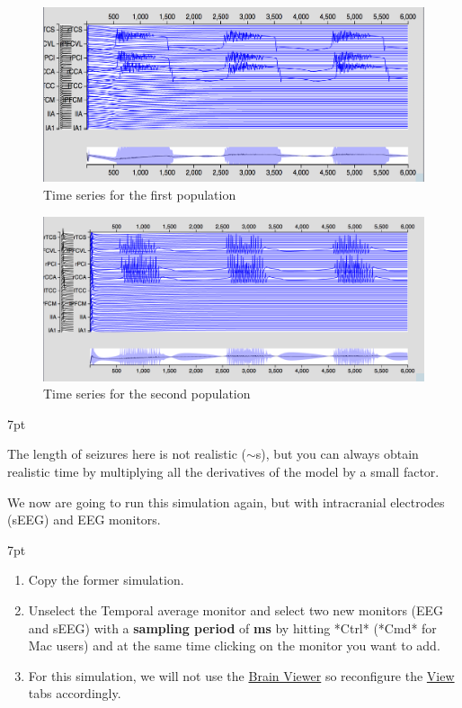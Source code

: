 \documentclass{tufte-handout}
\newenvironment{simulation}{%
  \def\FrameCommand{%
    \hspace{1pt}%
    {\color{ForestGreen}\vrule width 2pt}%
    {\color{simulationshade}\vrule width 4pt}%
    \colorbox{simulationshade}%
  }%
  \MakeFramed{\advance\hsize-\width\FrameRestore}%
  \noindent\hspace{-4.55pt}%
  \begin{adjustwidth}{}{7pt}%
  \vspace{2pt}\vspace{2pt}%
}
{%
  \vspace{2pt}\end{adjustwidth}\endMakeFramed%
}
\newenvironment{blah}{%
  \def\FrameCommand{%
    \hspace{1pt}%
    {\color{DarkOrange}\vrule width 2pt}%
    {\color{PeachPuff}\vrule width 4pt}%
    \colorbox{PeachPuff}%
  }%
  \MakeFramed{\advance\hsize-\width\FrameRestore}%
  \noindent\hspace{-4.55pt}%
  \begin{adjustwidth}{}{7pt}%
  \vspace{2pt}\vspace{2pt}%
}
{%
  \vspace{2pt}\end{adjustwidth}\endMakeFramed%
}
\begin{document}
\begin{figure}[h]
  \includegraphics[width=\linewidth]{Handout_UI_ModellingEpilepsy_TSPop1}%
  \caption{Time series for the first population}%
  \label{fig:first_pop}%
\end{figure}



\begin{figure}[h]
  \includegraphics[width=\linewidth]{Handout_UI_ModellingEpilepsy_TSPop2}%
  \caption{Time series for the second population}%
  \label{fig:second_pop}%
\end{figure}

\begin{blah}
  \begin{enumerate}[resume]
  The length of seizures here is not realistic ($\sim$\unit[2]{s}), but you can always obtain realistic time by multiplying
  all the derivatives of the model by a small factor.
  \end{enumerate}
\end{blah}
We now are going to run this simulation again, but with intracranial electrodes (sEEG) and EEG monitors.

\begin{simulation}
  \begin{enumerate}
  \item Copy the former simulation.
  \item Unselect the Temporal average monitor and select two new monitors (EEG and sEEG) with a \textbf{sampling period} of \textbf{\unit[1]{ms}} by hitting *Ctrl* (*Cmd* for Mac users) and at the same time clicking on the monitor you want to add.
  \item For this simulation, we will not use the \underline{Brain Viewer} so reconfigure the \underline{View} tabs accordingly.
\end{enumerate}
\end{simulation}
\end{document}
